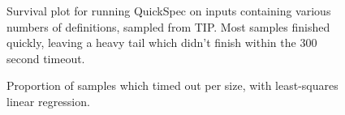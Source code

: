 \begin{figure}
  
  \caption{Survival plot %
    for running QuickSpec on inputs containing various numbers of definitions,
    sampled from TIP. Most samples finished quickly, leaving a heavy tail which
    didn't finish within the 300 second timeout.}
  \label{fig:survival}
\end{figure}

\begin{figure}
  
  \caption{Proportion of samples which timed out per size, with least-squares
    linear regression.}
  \label{fig:tailsize}
\end{figure}
